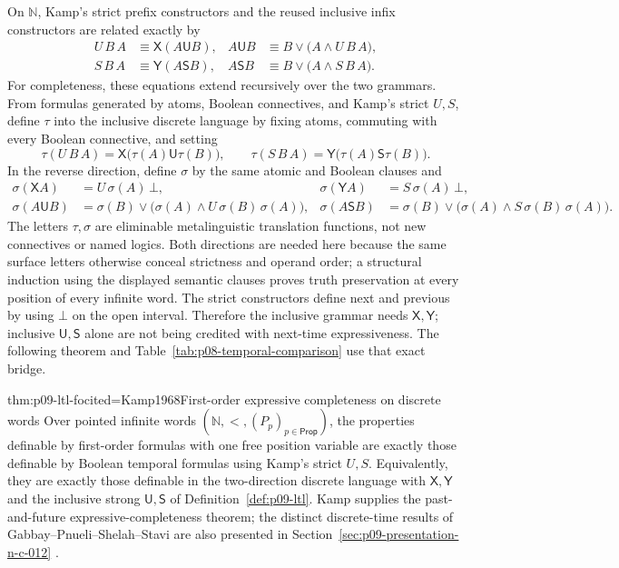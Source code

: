 On \(\mathbb N\), Kamp's strict prefix constructors and the reused inclusive
infix constructors are related exactly by
\[
\begin{aligned}
 U\,B\,A&\equiv\mathsf X(A\mathbin{\mathsf U}B),
 &A\mathbin{\mathsf U}B&\equiv
   B\lor\bigl(A\land U\,B\,A\bigr),\\
 S\,B\,A&\equiv\mathsf Y(A\mathbin{\mathsf S}B),
 &A\mathbin{\mathsf S}B&\equiv
   B\lor\bigl(A\land S\,B\,A\bigr).
\end{aligned}
\]
For completeness, these equations extend recursively over the two grammars.
From formulas generated by atoms, Boolean connectives, and Kamp's strict
\(U,S\), define \(\tau\) into the inclusive discrete language by fixing atoms,
commuting with every Boolean connective, and setting
\[
 \tau(U\,B\,A)=
 \mathsf X\bigl(\tau(A)\mathbin{\mathsf U}\tau(B)\bigr),
 \qquad
 \tau(S\,B\,A)=
 \mathsf Y\bigl(\tau(A)\mathbin{\mathsf S}\tau(B)\bigr).
\]
In the reverse direction, define \(\sigma\) by the same atomic and Boolean
clauses and
\[
\begin{aligned}
 \sigma(\mathsf XA)&=U\,\sigma(A)\,\bot,
 &\sigma(\mathsf YA)&=S\,\sigma(A)\,\bot,\\
 \sigma(A\mathbin{\mathsf U}B)
   &=\sigma(B)\lor
     \bigl(\sigma(A)\land U\,\sigma(B)\,\sigma(A)\bigr),
 &\sigma(A\mathbin{\mathsf S}B)
   &=\sigma(B)\lor
     \bigl(\sigma(A)\land S\,\sigma(B)\,\sigma(A)\bigr).
\end{aligned}
\]
The letters \(\tau,\sigma\) are eliminable metalinguistic translation
functions, not new connectives or named logics.  Both directions are needed
here because the same surface letters otherwise conceal strictness and operand
order; a structural induction using the displayed semantic clauses proves
truth preservation at every position of every infinite word.  The strict
constructors define next and previous by using \(\bot\) on the open interval.
Therefore the inclusive grammar needs \(\mathsf X,\mathsf Y\); inclusive
\(\mathsf U,\mathsf S\) alone are not being credited with next-time
expressiveness.  The following theorem and
Table~\ref{tab:p08-temporal-comparison} use that exact bridge.

\begin{hbtheorem}{thm:p09-ltl-fo}{cited=Kamp1968}{First-order expressive completeness on discrete words}
Over pointed infinite words \((\mathbb N,<,(P_p)_{p\in\mathsf{Prop}})\), the
properties definable by first-order formulas with one free position variable
are exactly those definable by Boolean temporal formulas using Kamp's strict
\(U,S\).  Equivalently, they are exactly those definable in the two-direction
discrete language with \(\mathsf X,\mathsf Y\) and the inclusive strong
\(\mathsf U,\mathsf S\) of Definition~\ref{def:p09-ltl}.
Kamp supplies the past-and-future expressive-completeness theorem;
the distinct discrete-time results of Gabbay--Pnueli--Shelah--Stavi
are also presented in Section~\ref{sec:p09-presentation-n-c-012}
\cite{Kamp1968,GabbayPnueliShelahStavi1980}.
\end{hbtheorem}


